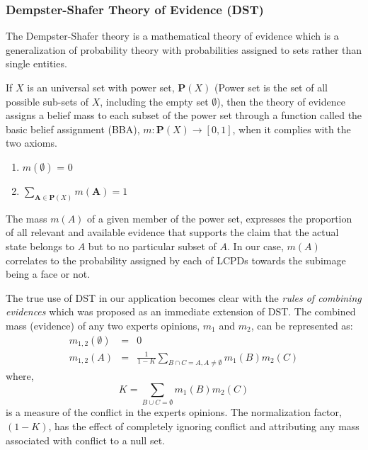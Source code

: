 \documentclass[times, 10pt,twocolumn]{article}
\begin{document}
\subsubsection{Dempster-Shafer Theory of Evidence (DST)}\label{DST}
The Dempster-Shafer theory is a mathematical theory of evidence
\cite{sentz_combination_2002} which is a generalization of
probability theory with probabilities assigned to sets rather than
single entities.

If $X$ is an universal set with power set, $\mathbf{P}(X)$ (Power
set is the set of all possible sub-sets of $X$, including the empty
set $\emptyset$), then the theory of evidence assigns a belief mass
to each subset of the power set through a function called the basic
belief assignment (BBA), $m:\mathbf{P}(X) \rightarrow [0,1]$, when
it complies with the two axioms.
\begin{enumerate}
\item $m(\emptyset)$ = 0
\item $\sum\limits_{\mathbf{A} \in \mathbf{P}(X)} m(\mathbf{A})= 1$
\end{enumerate}
The mass $m(A)$ of a given member of the power set, expresses the
proportion of all relevant and available evidence that supports the
claim that the actual state belongs to $A$ but to no particular
subset of $A$. In our case, $m(A)$ correlates to the probability
assigned by each of  LCPDs towards the subimage being a face or not.

The true use of DST in our application becomes clear with the {\it
rules of combining evidences} which was proposed as an immediate
extension of DST. The combined mass (evidence) of any two experts
opinions, $m_1$ and $m_2$, can be represented as:
\begin{eqnarray}
m_{1,2}(\emptyset) & = &  0 \\
m_{1,2}(A)& =  & \frac{1}{1-K}\sum\limits_{B\cap C = A, A \ne
\emptyset}m_1(B) m_2(C) \label{Eqn:16}
\end{eqnarray}
where,
\begin{equation}
K = \sum\limits_{B \cup C = \emptyset}m_1(B) m_2(C) \label{Eqn:17}
\end{equation}is a measure of the conflict in the experts opinions. The
normalization factor, $(1-K)$, has the effect of completely ignoring
conflict and attributing any mass associated with conflict to a null
set.
\end{document}
